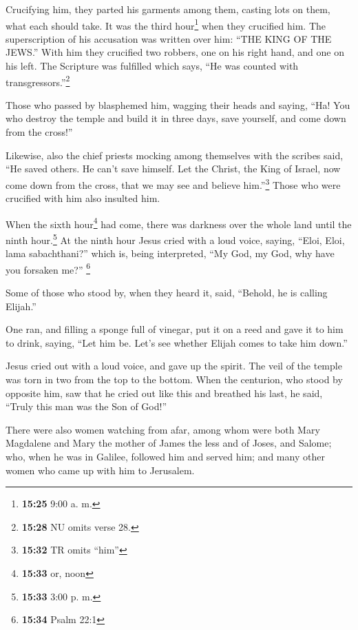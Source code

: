  Crucifying him, they parted his garments among them,
casting lots on them, what each should take.  It was the
third hour\footnote{\textbf{15:25} 9:00 a. m.} when they crucified him.
 The superscription of his accusation was written over
him: ``THE KING OF THE JEWS.''  With him they crucified
two robbers, one on his right hand, and one on his left. 
The Scripture was fulfilled which says, ``He was counted with
transgressors.''\footnote{\textbf{15:28} NU omits verse 28.}

 Those who passed by blasphemed him, wagging their heads
and saying, ``Ha! You who destroy the temple and build it in three days,
 save yourself, and come down from the cross!''

 Likewise, also the chief priests mocking among
themselves with the scribes said, ``He saved others. He can't save
himself.  Let the Christ, the King of Israel, now come
down from the cross, that we may see and believe him.''\footnote{\textbf{15:32}
  TR omits ``him''} Those who were crucified with him also insulted him.

 When the sixth hour\footnote{\textbf{15:33} or, noon}
had come, there was darkness over the whole land until the ninth
hour.\footnote{\textbf{15:33} 3:00 p. m.}  At the ninth
hour Jesus cried with a loud voice, saying, ``Eloi, Eloi, lama
sabachthani?'' which is, being interpreted, ``My God, my God, why have
you forsaken me?'' \footnote{\textbf{15:34} Psalm 22:1}

 Some of those who stood by, when they heard it, said,
``Behold, he is calling Elijah.''

 One ran, and filling a sponge full of vinegar, put it on
a reed and gave it to him to drink, saying, ``Let him be. Let's see
whether Elijah comes to take him down.''

 Jesus cried out with a loud voice, and gave up the
spirit.  The veil of the temple was torn in two from the
top to the bottom.  When the centurion, who stood by
opposite him, saw that he cried out like this and breathed his last, he
said, ``Truly this man was the Son of God!''

 There were also women watching from afar, among whom
were both Mary Magdalene and Mary the mother of James the less and of
Joses, and Salome;  who, when he was in Galilee, followed
him and served him; and many other women who came up with him to
Jerusalem.

